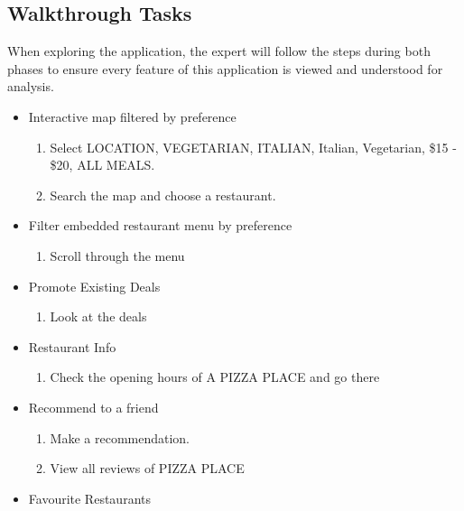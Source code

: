 \documentclass[a4 paper, 10pt]{article}
\begin{document}
    \subsection*{Walkthrough Tasks}
    When exploring the application, the expert will follow the steps during both phases to ensure every feature of this application is viewed and understood for analysis.
        \begin{multicols}{2}
            \begin{itemize}        
                \item Interactive map filtered by preference
                    \begin{enumerate}
                        \item Select LOCATION, VEGETARIAN, ITALIAN, Italian, Vegetarian, \$15 - \$20, ALL MEALS.
                        \item Search the map and choose a restaurant. 
                    \end{enumerate}
                \item Filter embedded restaurant menu by preference
                    \begin{enumerate}[resume]
                        \item Scroll through the menu
                    \end{enumerate}
                \item Promote Existing Deals
                    \begin{enumerate}[resume]
                        \item Look at the deals
                    \end{enumerate}
                \item Restaurant Info
                    \begin{enumerate}[resume]
                        \item Check the opening hours of A PIZZA PLACE and go there
                    \end{enumerate}
                \item Recommend to a friend
                    \begin{enumerate}[resume]
                        \item Make a recommendation.
                        \item View all reviews of PIZZA PLACE
                    \end{enumerate}
                \item Favourite Restaurants

\end{itemize}
\end{multicols}
\end{document}
